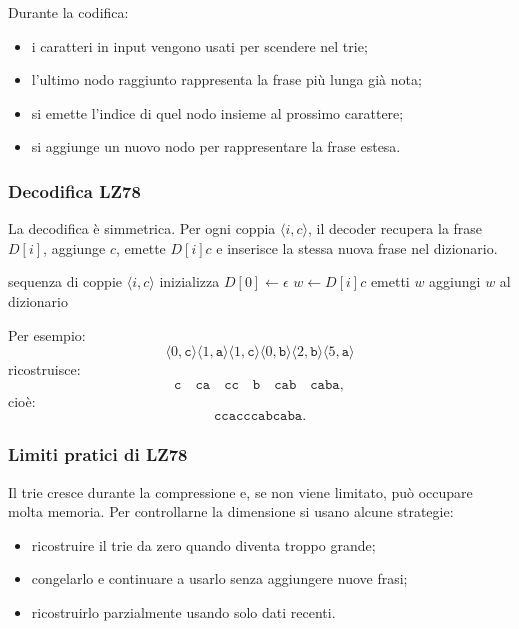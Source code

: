 \documentclass{article}
\theoremstyle{definition}
\numberwithin{equation}{section}
\begin{document}
Durante la codifica:
\begin{itemize}
    \item i caratteri in input vengono usati per scendere nel trie;
    \item l'ultimo nodo raggiunto rappresenta la frase più lunga già nota;
    \item si emette l'indice di quel nodo insieme al prossimo carattere;
    \item si aggiunge un nuovo nodo per rappresentare la frase estesa.
\end{itemize}

\subsubsection{Decodifica LZ78}
La decodifica è simmetrica. Per ogni coppia $\langle i,c\rangle$, il decoder recupera la frase $D[i]$, aggiunge $c$, emette $D[i]c$ e inserisce la stessa nuova frase nel dizionario.

\begin{algorithm}[htpb]
    \caption{Schema di decodifica LZ78}
    \begin{algorithmic}[1]
        \Require sequenza di coppie $\langle i,c\rangle$
        \State inizializza $D[0]\gets \epsilon$
        \State $w\gets D[i]c$
        \State emetti $w$
        \State aggiungi $w$ al dizionario
        \EndFor
    \end{algorithmic}
    \label{alg:lz78_decoding}
\end{algorithm}

Per esempio:
\[
    \langle 0,\texttt{c}\rangle
    \langle 1,\texttt{a}\rangle
    \langle 1,\texttt{c}\rangle
    \langle 0,\texttt{b}\rangle
    \langle 2,\texttt{b}\rangle
    \langle 5,\texttt{a}\rangle
\]
ricostruisce:
\[
    \texttt{c}\quad \texttt{ca}\quad \texttt{cc}\quad \texttt{b}\quad
    \texttt{cab}\quad \texttt{caba},
\]
cioè:
\[
    \texttt{ccacccabcaba}.
\]

\subsubsection{Limiti pratici di LZ78}
Il trie cresce durante la compressione e, se non viene limitato, può occupare molta memoria. Per controllarne la dimensione si usano alcune strategie:
\begin{itemize}
    \item ricostruire il trie da zero quando diventa troppo grande;
    \item congelarlo e continuare a usarlo senza aggiungere nuove frasi;
    \item ricostruirlo parzialmente usando solo dati recenti.
\end{itemize}
\end{document}
